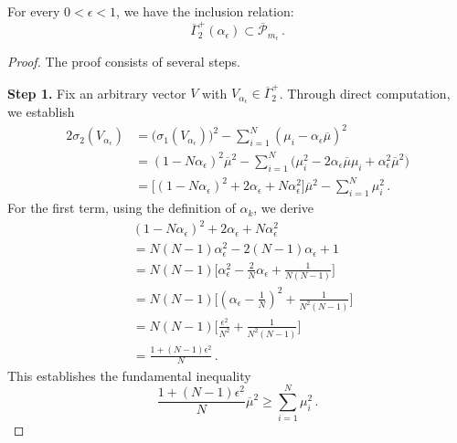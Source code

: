 \documentclass[10pt,a4paper]{amsart}
\begin{document}
\begin{proposition}\label{cone inclusion}
For every $0<\epsilon<1$, we have the inclusion relation:
\begin{equation}
\overline{\Gamma}^{+}_{2}(\alpha_{\epsilon})\subset \overline{\mathcal{P}}_{m_{\epsilon}}\,.
\end{equation}
\end{proposition}

\begin{proof}
The proof consists of several steps.\medskip

\noindent\textbf{Step 1.}  Fix an arbitrary vector $V$ with $V_{\alpha_{\epsilon}}\in \overline{\Gamma}^{+}_{2}$. Through direct computation, we establish 
\begin{equation*}
\begin{split}
2\sigma_{2}(V_{\alpha_{\epsilon}})&=\big(\sigma_{1}(V_{\alpha_{\epsilon}})\big)^2-\sum_{i=1}^{N}(\mu_{i}-\alpha_{\epsilon}\overline{\mu})^2\\
&=(1-N\alpha_{\epsilon})^{2}\overline{\mu}^{2}-\sum_{i=1}^{N}\big(\mu_{i}^{2}-2\alpha_{\epsilon}\overline{\mu}\mu_{i}+\alpha_{\epsilon}^{2}\overline{\mu}^{2} \big)\\
&=\big[(1-N\alpha_{\epsilon})^{2}+2\alpha_{\epsilon}+N\alpha_{\epsilon}^{2} \big]\overline{\mu}^{2}-\sum_{i=1}^{N}\mu_{i}^{2}\,.
\end{split}
\end{equation*}
For the first term, using the definition of $\alpha_{k}$, we derive
\begin{equation*}
\begin{split}
&(1-N\alpha_{\epsilon})^{2}+2\alpha_{\epsilon}+N\alpha_{\epsilon}^{2}\\
&=N(N-1)\alpha_{\epsilon}^{2}-2(N-1)\alpha_{\epsilon}+1\\
&=N(N-1)\big[\alpha_{\epsilon}^{2}-\frac{2}{N}\alpha_{\epsilon}+\frac{1}{N(N-1)} \big]\\
&=N(N-1)\big[(\alpha_{\epsilon}-\frac{1}{N})^{2}+\frac{1}{N^{2}(N-1)} \big]\\
&=N(N-1)\big[\frac{\epsilon^{2}}{N^{2}}+\frac{1}{N^{2}(N-1)} \big]\\
&=\frac{1+(N-1)\epsilon^2}{N}\,.
\end{split}
\end{equation*}
This establishes the fundamental inequality 
\begin{equation}\label{sigma 2}
\frac{1+(N-1)\epsilon^2}{N}\overline{\mu}^{2}\geq \sum_{i=1}^{N}\mu_{i}^{2}\,.
\end{equation}


\end{proof}
\end{document}
